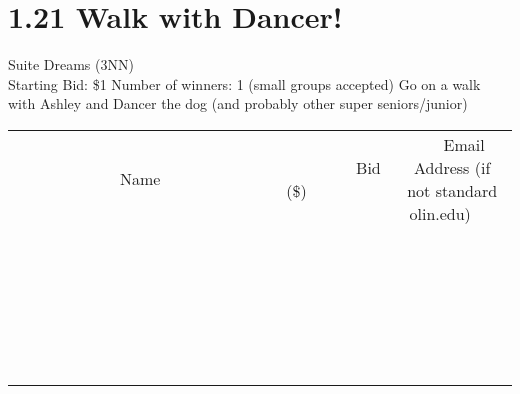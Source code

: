 \documentclass[11pt]{article}
\begin{document}
\section*{1.21 Walk with Dancer!}
Suite Dreams (3NN)
\\
Starting Bid: \$1
\newline
Number of winners: 1 (small groups accepted)
\newline
Go on a walk with Ashley and Dancer the dog (and probably other super seniors/junior)
\\[6ex]
\begin{tabular}{c c c}
~~~~~~~~~~~~~Name~~~~~~~~~~~~~ & ~~~~~~~~~Bid (\$)~~~~~~~~~  & ~~~Email Address (if not standard olin.edu)~~~\\
 & & \\
\hline
 & & \\
\hline
 & & \\
\hline
 & & \\
\hline
 & & \\
\hline
 & & \\
\hline
 & & \\
\hline
 & & \\
\hline
 & & \\
\hline
 & & \\
\hline
 & & \\
\hline
 & & \\
\hline
 & & \\
\hline
 & & \\
\hline
 & & \\
\hline
 & & \\
\hline
 & & \\
\hline
 & & \\
\hline
 & & \\
\hline
 & & \\
\hline
 & & \\
\hline
 & & \\
\hline
 & & \\
\hline
 & & \\
\hline
 & & \\
\hline
 & & \\
\hline
\end{tabular}
\newpage
\end{document}
